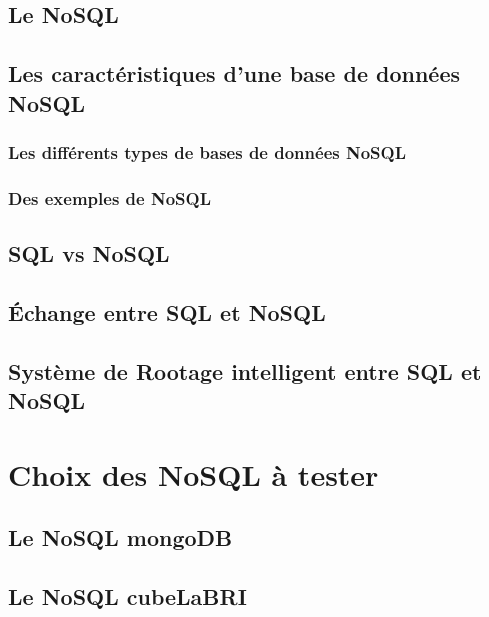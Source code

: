 %

\section{Le \textsf{NoSQL}}


\section{Les caractéristiques d'une base de données \textsf{NoSQL}}
%

\subsection{Les différents types de bases de données \textsf{NoSQL}}\label{categorie} 
 

\subsection{Des exemples de \textsf{NoSQL}}


\section{\textsf{SQL} vs \textsf{NoSQL}}
%

\section{Échange entre \textsf{SQL} et \textsf{NoSQL}}
%

\section{Système de Rootage intelligent entre \textsf{SQL} et \textsf{NoSQL}}
%

\chapter{Choix des \textsf{NoSQL} à tester}
\section{Le \textsf{NoSQL mongoDB}}\label{mongoDB}
%
\section{Le \textsf{NoSQL} \textsf{cubeLaBRI}}
%


